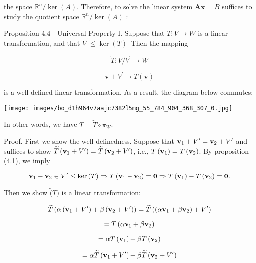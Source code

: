 \documentclass[11pt]{article}
\begin{document}
the space \({\mathbb{R}}^n/\ker \left( A\right)\). Therefore, to solve the linear system \(\mathbf{{Ax}} = B\) suffices to study the quotient space \({\mathbb{R}}^n/\ker \left( A\right)\) :

Proposition 4.4 - Universal Property I. Suppose that \(T : V \rightarrow  W\) is a linear transformation, and that \({V}^{\prime } \leq  \ker \left( T\right)\). Then the mapping

\[
\widetilde{T} : V/{V}^{\prime } \rightarrow  W
\]

\[
\mathbf{v} + {V}^{\prime } \mapsto  T\left( \mathbf{v}\right)
\]

is a well-defined linear transformation. As a result, the diagram below commutes:

\begin{center}
\texttt{[image: images/bo\_d1h964v7aajc7382l5mg\_55\_784\_904\_368\_307\_0.jpg]}
\end{center}
\hspace*{3em} 

In other words, we have \(T = \widetilde{T} \circ  {\pi }_{W}\).

Proof. First we show the well-definedness. Suppose that \({\bf v}_1 + {V}^{\prime } = {\bf v}_2 + {V}^{\prime }\) and suffices to show \(\widetilde{T}\left( {{\bf v}_1 + {V}^{\prime }}\right)  = \widetilde{T}\left( {{\bf v}_2 + {V}^{\prime }}\right)\), i.e., \(T\left( {\bf v}_1\right)  = T\left( {\bf v}_2\right)\). By proposition (4.1), we imply

\[
{\bf v}_1 - {\bf v}_2 \in  {V}^{\prime } \leq  \ker \left( T\right)  \Rightarrow  T\left( {{\bf v}_1 - {\bf v}_2}\right)  = \mathbf{0} \Rightarrow  T\left( {\bf v}_1\right)  - T\left( {\bf v}_2\right)  = \mathbf{0}.
\]

Then we show \(\widetilde{(}T)\) is a linear transformation:

\[
\widetilde{T}\left( {\alpha \left( {{\bf v}_1 + {V}^{\prime }}\right)  + \beta \left( {{\bf v}_2 + {V}^{\prime }}\right) }\right)  = \widetilde{T}\left( {\left( {\alpha {\bf v}_1 + \beta {\bf v}_2}\right)  + {V}^{\prime }}\right)
\]

\[
= T\left( {\alpha {\bf v}_1 + \beta {\bf v}_2}\right)
\]

\[
= {\alpha T}\left( {\bf v}_1\right)  + {\beta T}\left( {\bf v}_2\right)
\]

\[
= \alpha \widetilde{T}\left( {{\bf v}_1 + {V}^{\prime }}\right)  + \beta \widetilde{T}\left( {{\bf v}_2 + {V}^{\prime }}\right)
\]
\end{document}
